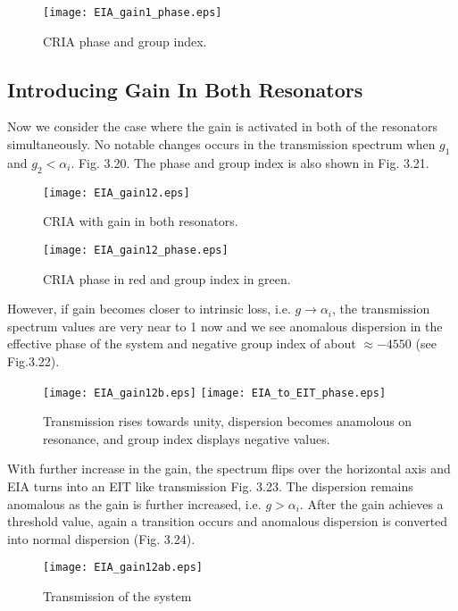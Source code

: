 \begin{figure}[h]
\centering
\texttt{[image: EIA\_gain1\_phase.eps]}
\caption{CRIA phase and group index.}
\end{figure}


\subsection{Introducing Gain In Both Resonators}
Now we consider the case where the gain is activated in both of the resonators simultaneously. No notable changes occurs in the transmission spectrum when $g_{1}$ and $g_{2} < \alpha_{i}$. Fig. 3.20. The phase and group index is also shown in Fig. 3.21.

\begin{figure}[h]
\centering
\texttt{[image: EIA\_gain12.eps]}
\caption{CRIA with gain in both resonators.}
\end{figure}


\begin{figure}[h]
\centering
\texttt{[image: EIA\_gain12\_phase.eps]}
\caption{CRIA phase in red and group index in green.}
\end{figure}

However, if gain becomes closer to intrinsic loss, i.e. $g \to \alpha_{i}$, the transmission spectrum values are very near to 1 now and we see anomalous dispersion in the effective phase of the system and negative group index of about $\approx -4550$ (see Fig.3.22).

\begin{figure}[h]
\centering
\texttt{[image: EIA\_gain12b.eps]}
\texttt{[image: EIA\_to\_EIT\_phase.eps]}
\caption{Transmission rises towards unity, dispersion becomes anamolous on resonance, and group index displays negative values.}
\end{figure}

With further increase in the gain, the spectrum flips over the horizontal axis and EIA turns into an EIT like transmission Fig. 3.23. The dispersion remains anomalous as the gain is further increased, i.e. $g > \alpha_{i}$. After the gain achieves a threshold value, again a transition occurs and anomalous dispersion is converted into normal dispersion (Fig. 3.24).

\begin{figure}[h]
\centering
\texttt{[image: EIA\_gain12ab.eps]}
\caption{Transmission of the system}
\end{figure}

